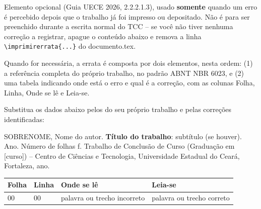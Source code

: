 Elemento opcional (Guia UECE 2026, 2.2.2.1.3), usado \textbf{somente} quando um erro é percebido depois que o trabalho já foi impresso ou depositado. Não é para ser preenchido durante a escrita normal do TCC -- se você não tiver nenhuma correção a registrar, apague o conteúdo abaixo e remova a linha \texttt{\textbackslash imprimirerrata\{...\}} do documento.tex.

Quando for necessária, a errata é composta por dois elementos, nesta ordem: (1) a referência completa do próprio trabalho, no padrão ABNT NBR 6023, e (2) uma tabela indicando onde está o erro e qual é a correção, com as colunas Folha, Linha, Onde se lê e Leia-se.

Substitua os dados abaixo pelos do seu próprio trabalho e pelas correções identificadas:

\noindent SOBRENOME, Nome do autor. \textbf{Título do trabalho}: subtítulo (se houver). Ano. Número de folhas f. Trabalho de Conclusão de Curso (Graduação em [curso]) -- Centro de Ciências e Tecnologia, Universidade Estadual do Ceará, Fortaleza, ano.

\begin{table}[ht!]
	\center
	\begin{tabular}{|p{1.4cm}|p{1cm}|p{3cm}|p{3cm}|}
		\hline
		\textbf{Folha} & \textbf{Linha} & \textbf{Onde se lê} &
		\textbf{Leia-se}\\
		\hline
		00 & 00 & palavra ou trecho incorreto & palavra ou trecho correto\\
		\hline
	\end{tabular}
\end{table}
